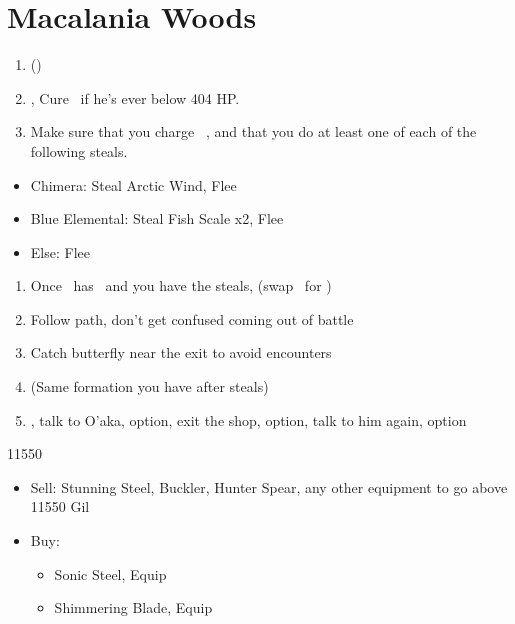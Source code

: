 \chapter{Macalania Woods}

\begin{enumerate}
    \item \formation{\tidus}{\rikku}{\auron} (\swap{\wakka}{\rikku})
    \item \save, Cure \tidus\ if he's ever below 404 HP.
    \item Make sure that you charge \rikku\ \od, and that you do at least one of each of the following steals.
\end{enumerate}
\begin{encounters}
    \begin{itemize}
        \item Chimera: Steal Arctic Wind, Flee
        \item Blue Elemental: Steal Fish Scale x2, Flee
        \item Else: Flee
    \end{itemize}
\end{encounters}
\begin{enumerate}[resume]
    \item Once \rikku\ has \od\ and you have the steals, \formation{\tidus}{\kimahri}{\auron} (swap \rikku\ for \kimahri)
    \item Follow path, don't get confused coming out of battle
    \item Catch butterfly near the exit to avoid encounters
    \item \formation{\tidus}{\kimahri}{\auron} (Same formation you have after steals)
    \item \save, talk to O'aka,  option, exit the shop,  option, talk to him again,  option
\end{enumerate}
\begin{shop}{11550}
    \begin{itemize}
        \item Sell: Stunning Steel, Buckler, Hunter Spear, any other equipment to go above 11550 Gil
        \item Buy:
        \begin{itemize}
            \item Sonic Steel, Equip
            \item Shimmering Blade, Equip
        \end{itemize}
    \end{itemize}
\end{shop}
